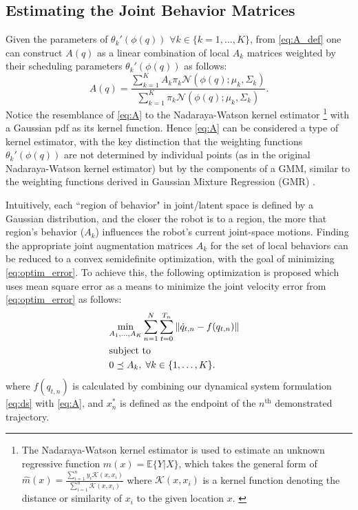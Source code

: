 \documentclass[letterpaper, 10 pt, conference,fleqn]{ieeeconf}
\begin{document}
\subsection{Estimating the Joint Behavior Matrices}
Given the parameters of $\theta_k'(\phi(q))$ $\forall k \in \{k=1,\dots,K\}$, from \eqref{eq:A_def} one can construct $A(q)$ as a linear combination of local $A_k$ matrices weighted by their scheduling parameters $\theta_k'(\phi(q))$ as follows: 
\begin{equation}
\label{eq:A}
A(q) = \frac{\sum_{k=1}^K A_k \pi_k\mathcal{N}(\phi(q); \mu_k, \Sigma_k)}{\sum_{k=1}^K \pi_k\mathcal{N} (\phi(q); \mu_k, \Sigma_k)}.
\end{equation} 
Notice the resemblance of \eqref{eq:A} to the Nadaraya-Watson kernel estimator \cite{nadaraya1964regress,watson1964regress}\footnote{The Nadaraya-Watson kernel estimator is used to estimate an unknown regressive function $m(x) = \mathbb{E}\{Y|X\}$, which takes the general form of $\widehat{m}(x) = \frac{\sum_{i=1}^n y_i \mathcal{K}(x,x_i)}{\sum_{i=1}^n \mathcal{K}(x,x_i)}$ where $\mathcal{K}(x,x_i)$ is a kernel function denoting the distance or similarity of $x_i$ to the given location $x$. \cite{nadaraya1964regress,watson1964regress}} with a Gaussian pdf as its kernel function. Hence \eqref{eq:A} can be considered a type of kernel estimator, with the key distinction that the weighting functions $\theta_k'(\phi(q))$ are not determined by individual points (as in the original Nadaraya-Watson kernel estimator) but by the components of a GMM, similar to the weighting functions derived in Gaussian Mixture Regression (GMR) \cite{sung2004gmr}. 

Intuitively, each ``region of behavior" in joint/latent space is defined by a Gaussian distribution, and the closer the robot is to a region, the more that region's behavior ($A_k$) influences the robot's current joint-space motions. Finding the appropriate joint augmentation matrices $A_k$ for the set of local behaviors can be reduced to a convex semidefinite optimization, with the goal of minimizing \eqref{eq:optim_error}. To achieve this, the following optimization is proposed which uses mean square error as a means to minimize the joint velocity error from \eqref{eq:optim_error} as follows:
\begin{equation}
\vspace{-10pt}
\begin{aligned}
&\underset{A_1, \dots, A_K}{\text{min}} 
\sum_{n=1}^N\sum_{t=0}^{T_n} \left \| \dot{q}_{t,n} - f(q_{t,n}) \right \| \\
& \text{subject to}&\\
&  0 \preceq A_k, \; \forall k \in \{1, \dots, K\}. &
\end{aligned}
\label{eq:opt}
\end{equation}
where $f(q_{t,n})$ is calculated by combining our dynamical system formulation \eqref{eq:ds} with \eqref{eq:A}, and $x^*_{n}$ is defined as the endpoint of the $ n^{\text{th}} $ demonstrated trajectory.
\end{document}
